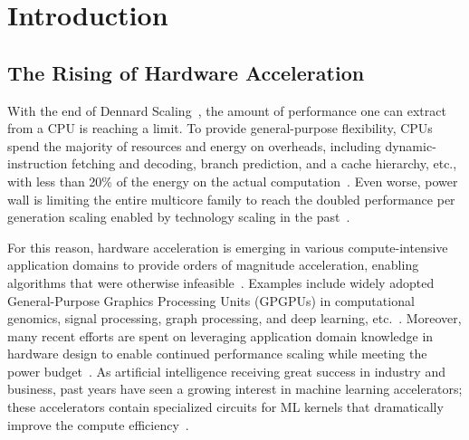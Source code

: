 \chapter{Introduction}

\section{The Rising of Hardware Acceleration}

With the end of Dennard Scaling~\cite{dennard}, the amount of performance one can extract from a CPU is reaching a limit.
To provide general-purpose flexibility, CPUs spend the majority of resources and energy on overheads, 
including dynamic-instruction fetching and decoding, branch prediction, and a cache hierarchy, etc., 
with less than 20\% of 
the energy on the actual computation~\cite{mark}.
Even worse, power wall is limiting the entire multicore family
to reach the doubled performance per generation scaling enabled by technology scaling in the 
past~\cite{multicorescale}.

For this reason, hardware acceleration is emerging in various compute-intensive application domains 
to provide orders of magnitude acceleration, enabling algorithms that were otherwise
infeasible~\cite{genomicaccel, bioaccel, fpgadeeplearn, fpgacripto}.
Examples include widely adopted General-Purpose Graphics Processing Units (GPGPUs) 
in computational genomics, signal processing, graph processing, and
deep learning, etc.~\cite{genomicaccel, bioaccel, fpgacloudsurvey}.
Moreover, many recent efforts are spent on leveraging application domain knowledge in hardware design to enable 
continued performance scaling while meeting the power budget~\cite{turinglecture}.
As artificial intelligence receiving great success in industry and business,
past years have seen a growing interest in machine learning accelerators;
these accelerators contain specialized circuits for ML kernels that dramatically improve the compute
efficiency~\cite{dadiannao,tpu,eie,chen2017eyeriss,tangram,truenorth}.

